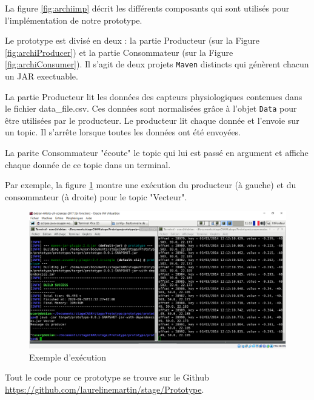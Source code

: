 \documentclass{article}
\begin{document}
			La figure \ref{fig:archiimp} décrit les différents composants qui sont utilisés pour l'implémentation de notre prototype.\par
			Le prototype est divisé en deux :
			la partie Producteur (sur la Figure \ref{fig:archiProducer}) et la partie Consommateur (sur la Figure \ref{fig:archiConsumer}). 
			Il s'agit de deux projets \texttt{Maven} distincts qui génèrent chacun un JAR exectuable.\par
			La partie Producteur lit les données des capteurs physiologiques contenues dans le fichier data\_file.csv. 
			Ces données sont normalisées grâce à l'objet \texttt{Data} pour être utilisées par le producteur.
			Le producteur lit chaque donnée et l'envoie sur un topic.
			Il s'arrête lorsque toutes les données ont été envoyées.\par
			La parite Consommateur "écoute" le topic qui lui est passé en argument et affiche chaque donnée de ce topic dans un terminal.\par
			Par exemple, la figure \ref{fig:exemple} montre une exécution du producteur (à gauche) et du consommateur (à droite) pour le topic "Vecteur".
			\begin{figure}
				\hspace*{-0.7cm}
				\includegraphics[scale=0.5]{../include/producteurConsommateur.PNG}
				\caption{Exemple d'exécution}
				\label{fig:exemple}
			\end{figure}\par
			Tout le code pour ce prototype se trouve sur le Github \href{https://github.com/laurelinemartin/stage/Prototype}{https://github.com/laurelinemartin/stage/Prototype}.
\end{document}
